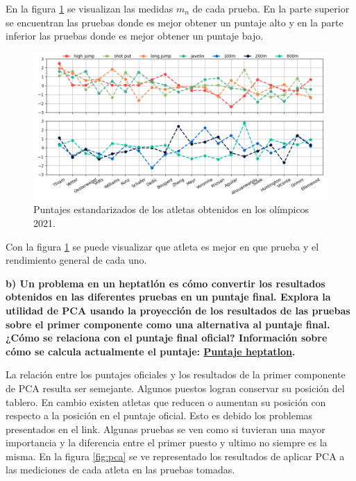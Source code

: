 En la figura \ref{fig:estandar_points} se visualizan las medidas $m_n$ de cada prueba. En la parte superior se encuentran las pruebas donde es mejor obtener un puntaje alto y en la parte inferior las pruebas donde es mejor obtener un puntaje bajo.

\begin{figure}[H]
    \centering
    \includegraphics[width=16cm]{Graphics/heptatlon.png}
    \caption{Puntajes estandarizados de los atletas obtenidos en los olímpicos 2021.}
    \label{fig:estandar_points}
\end{figure}

Con la figura \ref{fig:estandar_points} se puede visualizar que atleta es mejor en que prueba y el rendimiento general de cada uno.

\pagebreak
\textbf{b) Un problema en un heptatlón es cómo convertir los resultados obtenidos en las diferentes pruebas en un puntaje final. Explora la utilidad de PCA usando la proyección de los resultados de las pruebas sobre el primer componente como una alternativa al puntaje final. ¿Cómo se relaciona con el puntaje final oficial? Información sobre cómo se calcula actualmente el puntaje: \href{http://theaftermatter.blogspot.mx/2012/06/maths-of-heptathlon-why-scoring-system.html}{Puntaje heptatlon}.}

La relación entre los puntajes oficiales y los resultados de la primer componente de PCA resulta ser semejante. Algunos puestos logran conservar su posición del tablero. En cambio existen atletas que reducen o aumentan su posición con respecto a la posición en el puntaje oficial. Esto es debido los problemas presentados en el link. Algunas pruebas se ven como si tuvieran una mayor importancia y la diferencia entre el primer puesto y ultimo no siempre es la misma. En la figura \ref{fig:pca} se ve representado los resultados de aplicar PCA a las mediciones de cada atleta en las pruebas tomadas.

